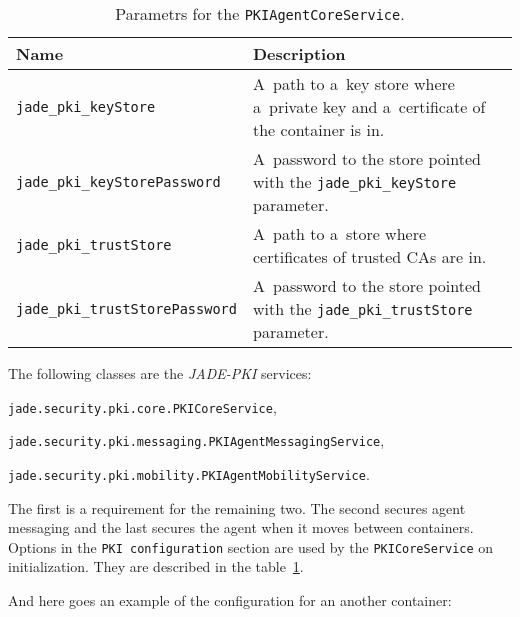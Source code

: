\documentclass[a4paper,11pt]{article}
\newenvironment{itemize*}
{\begin{itemize}
  \setlength{\itemsep}{0pt}
  \setlength{\parskip}{0pt}}
{\end{itemize}}
\begin{document}
\begin{table}[h]
  \caption{Parametrs for the \texttt{PKIAgentCoreService}.}
  \label{tab:pkiparams}
  \begin{center}
    {\small
      \begin{tabularx}{\linewidth}{|l|X|}
        \hline
        \textbf{Name} & \textbf{Description} \\
        \hline

        \texttt{jade\_pki\_keyStore} & A~path to a~key store where a~private
        key and a~certificate of the container is in.  \\

        \texttt{jade\_pki\_keyStorePassword} & A~password to the store pointed
        with the \texttt{jade\_pki\_keyStore} parameter.  \\

        \texttt{jade\_pki\_trustStore} & A~path to a~store where certificates
        of trusted CAs are in.  \\

        \texttt{jade\_pki\_trustStorePassword} & A~password to the store
        pointed with the \texttt{jade\_pki\_trustStore} parameter.  \\

        \hline
      \end{tabularx}
    }
  \end{center}
\end{table}

The following classes are the \textit{JADE-PKI} services:
\begin{itemize*}

  \item \texttt{jade.security.pki.core.PKICoreService},

  \item \texttt{jade.security.pki.messaging.PKIAgentMessagingService},

  \item \texttt{jade.security.pki.mobility.PKIAgentMobilityService}.

\end{itemize*}

The first is a requirement for the remaining two.  The second secures agent
messaging and the last secures the agent when it moves between containers.
Options in the \texttt{PKI configuration} section are used by the
\texttt{PKI\-Core\-Ser\-vice} on initialization.  They are described in the
table~\ref{tab:pkiparams}.

And here goes an example of the configuration for an another container:
\end{document}
